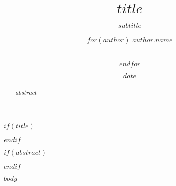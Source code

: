 \documentclass{acm_proc_article-sp}
\title{$title$}
\subtitle{$subtitle$}
\author{
$for(author)$
\alignauthor $author.name$ \\
        \affaddr{$author.affiliation$}\\
       \email{$author.email$}
\and $endfor$
}
\date{$date$}
\begin{document}
$if(title)$
\maketitle
$endif$

$if(abstract)$
\begin{abstract}
$abstract$
\end{abstract}
$endif$

$body$
\setlength{\parindent}{0in}
\end{document}
